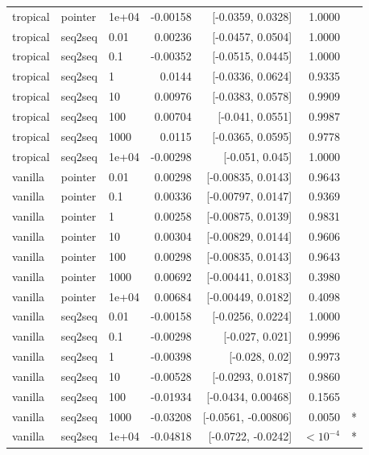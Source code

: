 \documentclass[10pt]{article}
\begin{document}
{\begin{longtable}{lllrrrl}
tropical & pointer & 1e+04 & -0.00158 & [-0.0359, 0.0328] & 1.0000 & \\
tropical & seq2seq & 0.01 & 0.00236 & [-0.0457, 0.0504] & 1.0000 & \\
tropical & seq2seq & 0.1 & -0.00352 & [-0.0515, 0.0445] & 1.0000 & \\
tropical & seq2seq & 1 & 0.0144 & [-0.0336, 0.0624] & 0.9335 & \\
tropical & seq2seq & 10 & 0.00976 & [-0.0383, 0.0578] & 0.9909 & \\
tropical & seq2seq & 100 & 0.00704 & [-0.041, 0.0551] & 0.9987 & \\
tropical & seq2seq & 1000 & 0.0115 & [-0.0365, 0.0595] & 0.9778 & \\
tropical & seq2seq & 1e+04 & -0.00298 & [-0.051, 0.045] & 1.0000 & \\
vanilla & pointer & 0.01 & 0.00298 & [-0.00835, 0.0143] & 0.9643 & \\
vanilla & pointer & 0.1 & 0.00336 & [-0.00797, 0.0147] & 0.9369 & \\
vanilla & pointer & 1 & 0.00258 & [-0.00875, 0.0139] & 0.9831 & \\
vanilla & pointer & 10 & 0.00304 & [-0.00829, 0.0144] & 0.9606 & \\
vanilla & pointer & 100 & 0.00298 & [-0.00835, 0.0143] & 0.9643 & \\
vanilla & pointer & 1000 & 0.00692 & [-0.00441, 0.0183] & 0.3980 & \\
vanilla & pointer & 1e+04 & 0.00684 & [-0.00449, 0.0182] & 0.4098 & \\
vanilla & seq2seq & 0.01 & -0.00158 & [-0.0256, 0.0224] & 1.0000 & \\
vanilla & seq2seq & 0.1 & -0.00298 & [-0.027, 0.021] & 0.9996 & \\
vanilla & seq2seq & 1 & -0.00398 & [-0.028, 0.02] & 0.9973 & \\
vanilla & seq2seq & 10 & -0.00528 & [-0.0293, 0.0187] & 0.9860 & \\
vanilla & seq2seq & 100 & -0.01934 & [-0.0434, 0.00468] & 0.1565 & \\
vanilla & seq2seq & 1000 & -0.03208 & [-0.0561, -0.00806] & 0.0050 & *\\
vanilla & seq2seq & 1e+04 & -0.04818 & [-0.0722, -0.0242] & $<10^{-4}$ & *\\
\bottomrule
\end{longtable}
}
\end{document}
